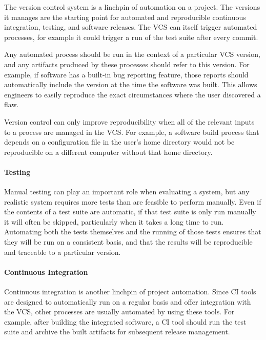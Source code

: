 The version control system is a linchpin of automation on a
project. The versions it manages are the starting point for automated
and reproducible continuous integration, testing, and software
releases. The VCS can itself trigger automated processes, for example
it could trigger a run of the test suite after every commit.

Any automated process should be run in the context of a particular VCS
version, and any artifacts produced by these processes should refer to
this version. For example, if software has a built-in bug reporting
feature, those reports should automatically include the version at the
time the software was built. This allows engineers to easily reproduce
the exact circumstances where the user discovered a flaw.

Version control can only improve reproducibility when all of the
relevant inputs to a process are managed in the VCS. For example, a
software build process that depends on a configuration file in the
user's home directory would not be reproducible on a different
computer without that home directory.

\paragraph{Testing}

Manual testing can play an important role when evaluating a system,
but any realistic system requires more tests than are feasible to
perform manually. Even if the contents of a test suite are automatic,
if that test suite is only run manually it will often be skipped,
particularly when it takes a long time to run. Automating both the
tests themselves and the running of those tests ensures that they will
be run on a consistent basis, and that the results will be
reproducible and traceable to a particular version.

\paragraph{Continuous Integration}

Continuous integration is another linchpin of project
automation. Since CI tools are designed to automatically run on a
regular basis and offer integration with the VCS, other processes are
usually automated by using these tools. For example, after building
the integrated software, a CI tool should run the test suite and
archive the built artifacts for subsequent release management.

